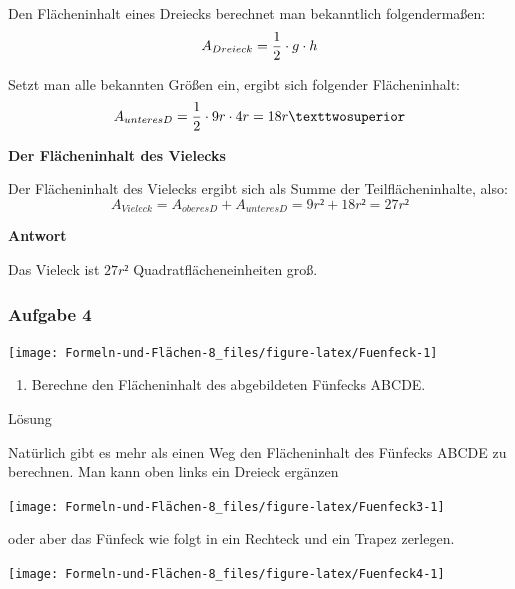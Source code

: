 \documentclass[
  ngerman,
]{book}
\providecommand{\tightlist}{%
  \setlength{\itemsep}{0pt}\setlength{\parskip}{0pt}}
\begin{document}
Den Flächeninhalt eines Dreiecks berechnet man bekanntlich folgendermaßen:
\[A_{Dreieck} = {1 \over 2} \cdot g \cdot h\]

Setzt man alle bekannten Größen ein, ergibt sich folgender Flächeninhalt:
\[ A_{unteresD} = {1 \over 2} \cdot 9r \cdot 4r = 18r²\]

\textbf{Der Flächeninhalt des Vielecks}

Der Flächeninhalt des Vielecks ergibt sich als Summe der Teilflächeninhalte, also:
\[A_{Vieleck} = A_{oberesD} + A_{unteresD} = 9r² + 18r² = 27r²\]

\textbf{Antwort}

Das Vieleck ist \(27r²\) Quadratflächeneinheiten groß.

\hypertarget{section-17}{%
\subsubsection*{}\label{section-17}}

\hypertarget{aufgabe-4-3}{%
\subsubsection*{Aufgabe 4}\label{aufgabe-4-3}}

\begin{center}\texttt{[image: Formeln-und-Flächen-8\_files/figure-latex/Fuenfeck-1]} \end{center}

\begin{enumerate}
\def\labelenumi{\alph{enumi})}
\tightlist
\item
  Berechne den Flächeninhalt des abgebildeten Fünfecks ABCDE.
\end{enumerate}

Lösung

Natürlich gibt es mehr als einen Weg den Flächeninhalt des Fünfecks ABCDE zu berechnen. Man kann oben links ein Dreieck ergänzen

\begin{center}\texttt{[image: Formeln-und-Flächen-8\_files/figure-latex/Fuenfeck3-1]} \end{center}

oder aber das Fünfeck wie folgt in ein Rechteck und ein Trapez zerlegen.

\begin{center}\texttt{[image: Formeln-und-Flächen-8\_files/figure-latex/Fuenfeck4-1]} \end{center}
\end{document}
